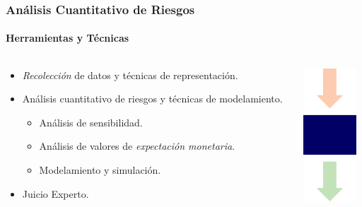 \frame
{
\frametitle{Análisis Cuantitativo de Riesgos}
\framesubtitle{Herramientas y Técnicas}
\begin{columns}
	\begin{column}{0.8\textwidth}
		\begin{itemize}
			\item<1-> \emph{Recolección} de datos y técnicas de representación.
			\item<2-> Análisis cuantitativo de riesgos y técnicas de modelamiento.
			\begin{itemize}
				\item<3-> Análisis de sensibilidad.
				\item<4-> Análisis de valores de \emph{expectación monetaria}.
				\item<5-> Modelamiento  y simulación.
			\end{itemize}
			\item<6-> Juicio Experto.
		\end{itemize}
	\end{column}
	\begin{column}{0.2\textwidth}
		\includegraphics[width=2cm]{img/tools}
	\end{column}
\end{columns}
}

